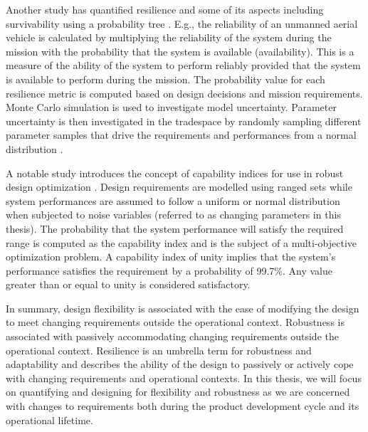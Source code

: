 Another study has quantified resilience and some of its aspects including survivability using a probability tree \cite{Small2019}. E.g., the reliability of an unmanned aerial vehicle is calculated by multiplying the reliability of the system during the mission with the probability that the system is available (availability). This is a measure of the ability of the system to perform reliably provided that the system is available to perform during the mission. The probability value for each resilience metric is computed based on design decisions and mission requirements. Monte Carlo simulation is used to investigate model uncertainty. Parameter uncertainty is then investigated in the tradespace by randomly sampling different parameter samples that drive the requirements and performances from a normal distribution \cite{Small2019}. 

{\color{red} A notable study introduces the concept of capability indices for use in robust design optimization \cite{Chen1999}. Design requirements are modelled using ranged sets while system performances are assumed to follow a uniform or normal distribution when subjected to noise variables (referred to as changing parameters in this thesis). The probability that the system performance will satisfy the required range is computed as the capability index and is the subject of a multi-objective optimization problem. A capability index of unity implies that the system's performance satisfies the requirement by a probability of 99.7\%. Any value greater than or equal to unity is considered satisfactory.}

In summary, design flexibility is associated with the ease of modifying the design to meet changing requirements outside the operational context. Robustness is associated with passively accommodating changing requirements outside the operational context. Resilience is an umbrella term for robustness and adaptability and describes the ability of the design to passively or actively cope with changing requirements and operational contexts. In this thesis, we will focus on quantifying and designing for flexibility and robustness as we are concerned with changes to requirements both during the product development cycle and its operational lifetime. 


